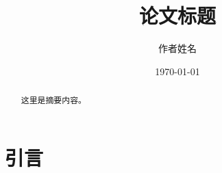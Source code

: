 \documentclass[10pt]{article}
\title{论文标题}
\author{作者姓名}
\date{\today}
\begin{document}
	
	\maketitle
	
	\begin{abstract}
		这里是摘要内容。
	\end{abstract}
	
	\section{引言}
\end{document}
